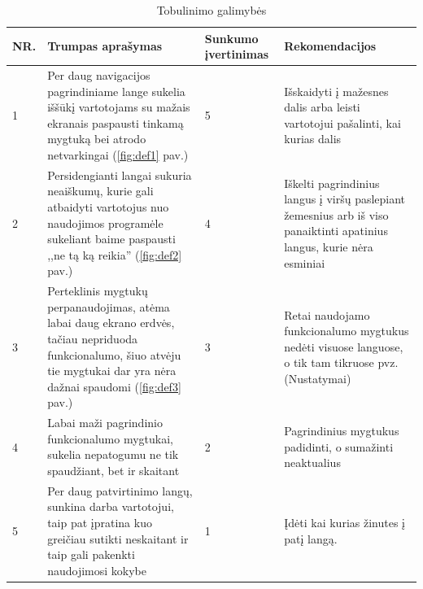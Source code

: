 \documentclass{VUMIFPSkursinis}
\begin{document}
\begin{table}[H]\footnotesize
  \centering
  \caption{Tobulinimo galimybės}
  \begin{tabular}{|p{}|p{}|p{}|p{}|}
	\hline
	NR. & Trumpas aprašymas & Sunkumo įvertinimas & Rekomendacijos \\
	\hline
	1 & Per daug navigacijos pagrindiniame lange sukelia iššūkį vartotojams su mažais ekranais paspausti tinkamą mygtuką bei atrodo netvarkingai (\ref{fig:def1} pav.) & 5 & Išskaidyti į mažesnes dalis arba leisti vartotojui pašalinti, kai kurias dalis \\
	\hline
	2 & Persidengianti langai sukuria neaiškumų, kurie gali atbaidyti vartotojus nuo naudojimos programėle sukeliant baime paspausti ,,ne tą ką reikia'' (\ref{fig:def2} pav.)& 4 & Iškelti pagrindinius langus į viršų paslepiant žemesnius arb iš viso panaiktinti apatinius langus, kurie nėra esminiai \\
	\hline
	3 & Perteklinis mygtukų perpanaudojimas, atėma labai daug ekrano erdvės, tačiau nepriduoda funkcionalumo, šiuo atvėju tie mygtukai dar yra nėra dažnai spaudomi (\ref{fig:def3} pav.) & 3 & Retai naudojamo funkcionalumo mygtukus nedėti visuose languose, o tik tam tikruose pvz.(Nustatymai)\\
	\hline
	4 & Labai maži pagrindinio funkcionalumo mygtukai, sukelia nepatogumu ne tik spaudžiant, bet ir skaitant & 2 & Pagrindinius mygtukus padidinti, o sumažinti neaktualius \\
	\hline
	5 & Per daug patvirtinimo langų, sunkina darba vartotojui, taip pat įpratina kuo greičiau sutikti neskaitant ir taip gali pakenkti naudojimosi kokybe & 1 & Įdėti kai kurias žinutes į patį langą. \\
	\hline
  \end{tabular}
  \label{tab:defects}
\end{table}
\end{document}
